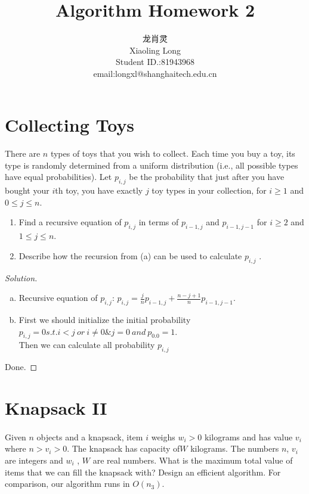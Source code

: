 \documentclass[a4paper]{article}
\title{Algorithm Homework 2}
\author{龙肖灵 \\Xiaoling Long\\Student ID.:81943968\\email:longxl@shanghaitech.edu.cn}
\newenvironment{solution}
  {\renewcommand\qedsymbol{$\blacksquare$}\begin{proof}[Solution]}
  {\end{proof}}
\begin{document}
\maketitle

\section*{Collecting Toys}
\paragraph{}
There are $n$ types of toys that you wish to collect. Each time you buy a toy, its type is randomly
determined from a uniform distribution (i.e., all possible types have equal probabilities). Let $p_{i,j}$ be the
probability that just after you have bought your $i$th toy, you have exactly $j$ toy types in your collection, for
$i\ge1$ and $0 \le j \le n$.
\begin{enumerate}[ (a) ]
  \item Find a recursive equation of $p_{i,j}$ in terms of $p_{i−1,j}$ and $p_{i-1,j-1}$ for $i \ge 2$ and $1 \le j \le n$.
  \item Describe how the recursion from (a) can be used to calculate $p_{i,j}$ .
\end{enumerate}


\begin{solution}\
  \begin{enumerate}[(a)]
    \item Recursive equation of $p_{i,j}$: $p_{i,j}=\frac{j}{n}p_{i-1,j}+\frac{n-j+1}{n}p_{i-1,j-1}$.
    \item First we should initialize the initial probability $p_{i,j}=0 s.t. i<j \ or\  i\ne0\& j=0\  and\  p_{0.0}=1$.\\
    Then we can calculate all probability $p_{i,j}$
  \end{enumerate}
  Done.
\end{solution}

\section*{Knapsack II}
\paragraph{}
Given $n$ objects and a knapsack, item $i$ weighs $w_{i}>0$ kilograms and has value $v_{i}$ where $n > v_{i}> 0$.
The knapsack has capacity of$ W$ kilograms. The numbers $n$, $v_{i}$ are integers and $w_{i}$ , $W$ are real numbers.
What is the maximum total value of items that we can fill the knapsack with? Design an efficient algorithm.
For comparison, our algorithm runs in $O(n_{3} )$.
\end{document}
